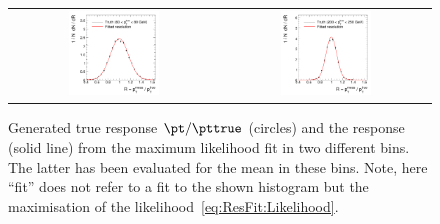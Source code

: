 \begin{figure}[ht]
  \centering
  \begin{tabular}{cc}
    \includegraphics[width=0.45\textwidth]{figures/resFit_ToyMC_PtGenCuts_ResolutionBin1} &
    \includegraphics[width=0.45\textwidth]{figures/resFit_ToyMC_PtGenCuts_ResolutionBin7} \\      
  \end{tabular}
  \caption{Generated true response \mbox{$\pt / \pttrue$} (circles) and the response (solid line) from the maximum likelihood fit in two different \pttrue bins.
    The latter has been evaluated for the mean \pttrue in these bins.
    Note, here ``fit'' does not refer to a fit to the shown histogram but the maximisation of the likelihood~\eqref{eq:ResFit:Likelihood}.
  }
  \label{fig:ResFit:App:ToyMC:Response}
\end{figure}

